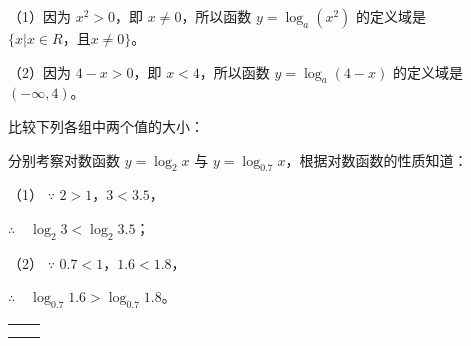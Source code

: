 \jie （1）因为 $x^2 > 0$，即 $x \neq 0$，所以函数 $y = \log_a (x^2)$ 的定义域是 $\{x | x \in R \text{，且} x \neq 0\}$。

（2）因为 $4 - x > 0$，即 $x < 4$，所以函数 $y = \log_a (4 - x)$ 的定义域是 $(-\infty, 4)$。

\liti 比较下列各组中两个值的大小：

\begin{xiaoxiaotis}
    


\end{xiaoxiaotis}

\jie 分别考察对数函数 $y = \log_2 x$ 与 $y = \log_{0.7} x$，根据对数函数的性质知道：

（1） $\because$ \quad $2 > 1$，$3 < 3.5$，

$\therefore \quad \log_2 3 < \log_2 3.5$；

（2） $\because$ \quad $0.7 < 1$，$1.6 < 1.8$，

$\therefore \quad \log_{0.7} 1.6 > \log_{0.7} 1.8$。

\lianxi

\begin{xiaotis}


\begin{xiaoxiaotis}


    \vspace{0.5em}

    \vspace{0.5em}
    \vspace{0.5em}


\end{xiaoxiaotis}

\begin{xiaoxiaotis}

    \renewcommand\arraystretch{1.5}
    \begin{tabular}[t]{*{2}{@{}p{16em}}}
         &  \\
         & 
    \end{tabular}

\end{xiaoxiaotis}

\end{xiaotis}
